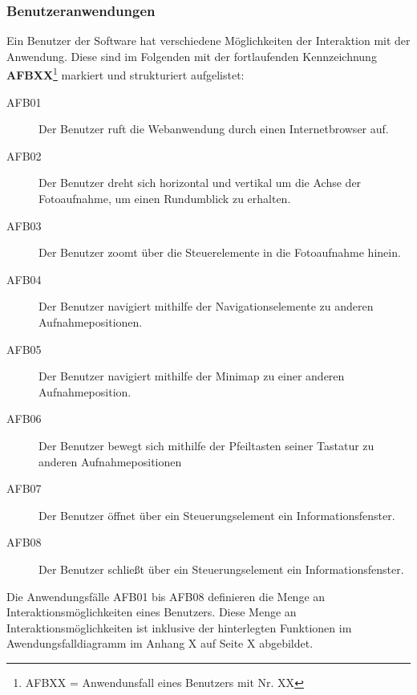\subsubsection{Benutzeranwendungen}
\label{sec:Benutzeranwendungen}

Ein Benutzer der Software hat verschiedene Möglichkeiten der Interaktion mit
der Anwendung. Diese sind im Folgenden mit der fortlaufenden
Kennzeichnung \textbf{AFBXX}\footnote{AFBXX = Anwendunsfall eines Benutzers mit
Nr. XX} markiert und strukturiert aufgelistet:

\begin{description}
  \item[AFB01] Der Benutzer ruft die Webanwendung durch einen Internetbrowser
  auf.
  \item[AFB02] Der Benutzer dreht sich horizontal und vertikal um die Achse
  der Fotoaufnahme, um einen Rundumblick zu erhalten.
  \item[AFB03] Der Benutzer zoomt über die Steuerelemente in die Fotoaufnahme
  hinein.
  \item[AFB04] Der Benutzer navigiert mithilfe der Navigationselemente zu
  anderen Aufnahmepositionen.
  \item[AFB05] Der Benutzer navigiert mithilfe der Minimap zu einer anderen
  Aufnahmeposition.
  \item[AFB06] Der Benutzer bewegt sich mithilfe der Pfeiltasten seiner
  Tastatur zu anderen Aufnahmepositionen
  \item[AFB07] Der Benutzer öffnet über ein Steuerungselement ein
  Informationsfenster.
  \item[AFB08] Der Benutzer schließt über ein Steuerungselement ein
  Informationsfenster.
\end{description}

Die Anwendungsfälle AFB01 bis AFB08 definieren die Menge an
Interaktionsmöglichkeiten eines Benutzers. Diese Menge an
Interaktionsmöglichkeiten ist inklusive der hinterlegten Funktionen im
Awendungsfalldiagramm im Anhang X auf Seite X abgebildet.
